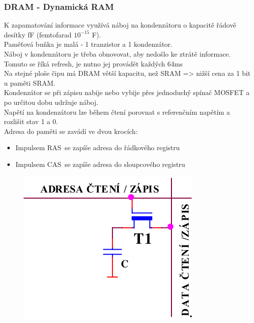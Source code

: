 \subsubsection*{DRAM - Dynamická RAM}
K zapamatování informace využívá náboj na kondenzátoru o kapacitě řádově desítky fF (femtofarad $10^{-15}$ F).\\
Paměťová buňka je malá - 1 tranzistor a 1 kondenzátor.\\
Náboj v kondenzátoru je třeba obnovovat, aby nedošlo ke ztrátě informace. Tomuto se říká refresh, je nutno jej provádět každých 64ms\\
Na stejné ploše čipu má DRAM větší kapacitu, než SRAM => nižší cena za 1 bit u paměti SRAM.\\
Kondenzátor se při zápisu nabije nebo vybije přes jednoduchý spínač MOSFET a po určitou dobu udržuje náboj.\\
Napětí na kondenzátoru lze během čtení porovnat s referenčním napětím a rozlišit stav 1 a 0.\\
Adresa do paměti se zavádí ve dvou krocích:
\begin{itemize}
    \item Impulsem RAS\ se zapíše adresa do řádkového registru
    \item Impulsem CAS\ se zapíše adresa do sloupcového registru
\end{itemize}
\begin{figure}
    \centering
    \includegraphics[scale = 0.3]{img/DRAM.png}
\end{figure}

